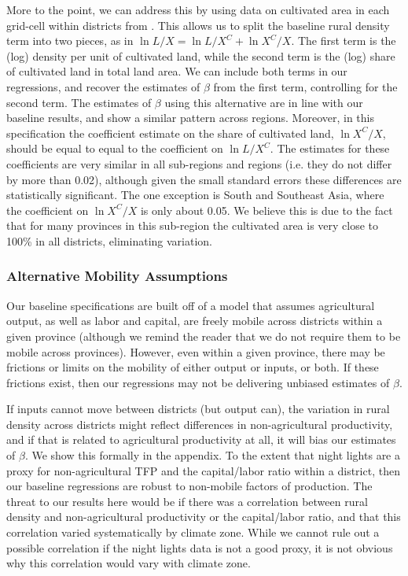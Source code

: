 \documentclass[11pt]{article}
\begin{document}
More to the point, we can address this by using data on cultivated area in each grid-cell within districts from \cite{gaez}. This allows us to split the baseline rural density term into two pieces, as in $\ln L/X = \ln L/X^C + \ln X^C/X$. The first term is the (log) density per unit of cultivated land, while the second term is the (log) share of cultivated land in total land area. We can include both terms in our regressions, and recover the estimates of $\beta$ from the first term, controlling for the second term. The estimates of $\beta$ using this alternative are in line with our baseline results, and show a similar pattern across regions. Moreover, in this specification the coefficient estimate on the share of cultivated land, $\ln X^C/X$, should be equal to equal to the coefficient on $\ln L/X^C$. The estimates for these coefficients are very similar in all sub-regions and regions (i.e. they do not differ by more than 0.02), although given the small standard errors these differences are statistically significant. The one exception is South and Southeast Asia, where the coefficient on $\ln X^C/X$ is only about 0.05. We believe this is due to the fact that for many provinces in this sub-region the cultivated area is very close to 100\% in all districts, eliminating variation.

\subsubsection{Alternative Mobility Assumptions} 
Our baseline specifications are built off of a model that assumes agricultural output, as well as labor and capital, are freely mobile across districts within a given province (although we remind the reader that we do not require them to be mobile across provinces). However, even within a given province, there may be frictions or limits on the mobility of either output or inputs, or both. If these frictions exist, then our regressions may not be delivering unbiased estimates of $\beta$.

If inputs cannot move between districts (but output can), the variation in rural density across districts might reflect differences in non-agricultural productivity, and if that is related to agricultural productivity at all, it will bias our estimates of $\beta$. We show this formally in the appendix. To the extent that night lights are a proxy for non-agricultural TFP and the capital/labor ratio within a district, then our baseline regressions are robust to non-mobile factors of production. The threat to our results here would be if there was a correlation between rural density and non-agricultural productivity or the capital/labor ratio, and that this correlation varied systematically by climate zone. While we cannot rule out a possible correlation if the night lights data is not a good proxy, it is not obvious why this correlation would vary with climate zone.
\end{document}
